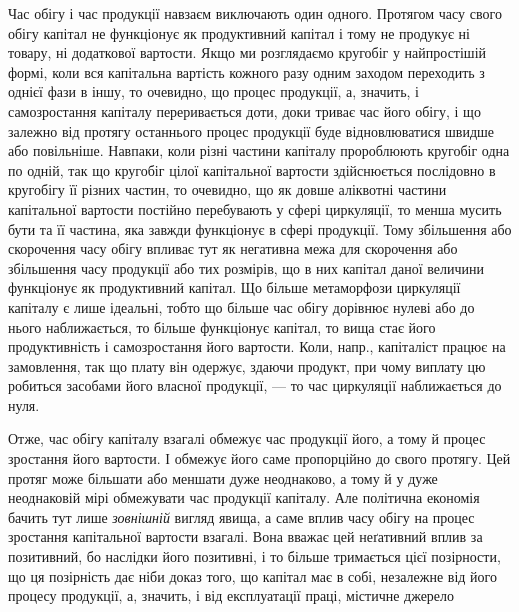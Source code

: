 Час обігу і час продукції навзаєм виключають один одного. Протягом
часу свого обігу капітал не функціонує як продуктивний капітал і тому
не продукує ні товару, ні додаткової вартости. Якщо ми розглядаємо
кругобіг у найпростішій формі, коли вся капітальна вартість кожного разу
одним заходом переходить з однієї фази в іншу, то очевидно, що процес
продукції, а, значить, і самозростання капіталу переривається доти, доки
триває час його обігу, і що залежно від протягу останнього процес продукції
буде відновлюватися швидше або повільніше. Навпаки, коли різні
частини капіталу пророблюють кругобіг одна по одній, так що кругобіг
цілої капітальної вартости здійснюється послідовно в кругобігу її
різних частин, то очевидно, що як довше аліквотні частини капітальної
вартости постійно перебувають у сфері циркуляції, то менша
мусить бути та її частина, яка завжди функціонує в сфері
продукції. Тому збільшення або скорочення часу обігу впливає тут як
негативна межа для скорочення або збільшення часу продукції або тих
розмірів, що в них капітал даної величини функціонує як продуктивний
капітал. Що більше метаморфози циркуляції капіталу є лише ідеальні,
тобто що більше час обігу дорівнює нулеві або до нього наближається,
то більше функціонує капітал, то вища стає його продуктивність і самозростання
його вартости. Коли, напр., капіталіст працює на замовлення, так
що плату він одержує, здаючи продукт, при чому виплату цю робиться
засобами його власної продукції, — то час циркуляції наближається до
нуля.

Отже, час обігу капіталу взагалі обмежує час продукції його, а тому
й процес зростання його вартости. І обмежує його саме пропорційно
до свого протягу. Цей протяг може більшати або меншати дуже неоднаково,
а тому й у дуже неоднаковій мірі обмежувати час
продукції капіталу. Але політична економія бачить тут лише \emph{зовнішній}
вигляд явища, а саме вплив часу обігу на процес зростання капітальної
вартости взагалі. Вона вважає цей неґативний вплив за позитивний, бо
наслідки його позитивні, і то більше тримається цієї позірности, що ця позірність
дає ніби доказ того, що капітал має в собі, незалежне від його
процесу продукції, а, значить, і від експлуатації праці, містичне джерело
\parbreak{}  %
